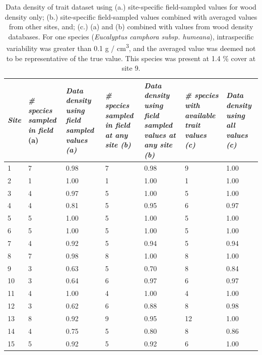 \begin{landscape}
\begin{table}[ht]
\tiny
\centering
\caption[Summary of PCA across all hydrological metrics.]{\small{Data density of trait dataset using (a.) site-specific field-sampled values for wood density only; (b.) site-specific field-sampled values combined with averaged values from other sites, and; (c.) (a) and (b) combined with values from wood density databases. For one species (\textit{Eucalyptus camphora subsp. humeana}), intraspecific variability was greater than 0.1 g / cm\textsuperscript{3}, and the averaged value was deemed not to be representative of the true value. This species was present at 1.4 \% cover at site 9.}}
\label{tab:Ch2sup_T4}
{\tabulinesep=1.2mm
\begin{tabu}to 
\hline
\textit{Site} & \textit{\# species sampled in field} (a) & \textit{Data density using field sampled values (a)} & \textit{\# species sampled in field at any site (b)} & \textit{Data density using field sampled values at any site (b)} & \textit{\# species with available trait values (c)} & \textit{Data density using all values (c)} \\  & 7 & 0.98 & 7 & 0.98 & 9 & 1.00 \\
2 & 1 & 1.00 & 1 & 1.00 & 1 & 1.00 \\
3 & 4 & 0.97 & 5 & 1.00 & 5 & 1.00 \\
4 & 4 & 0.81 & 5 & 0.95 & 6 & 0.97 \\
5 & 5 & 1.00 & 5 & 1.00 & 5 & 1.00 \\
6 & 5 & 1.00 & 5 & 1.00 & 5 & 1.00 \\
7 & 4 & 0.92 & 5 & 0.94 & 5 & 0.94 \\
8 & 7 & 0.98 & 8 & 1.00 & 8 & 1.00 \\
9 & 3 & 0.63 & 5 & 0.70 & 8 & 0.84 \\
10 & 3 & 0.64 & 6 & 0.97 & 6 & 0.97 \\
11 & 4 & 1.00 & 4 & 1.00 & 4 & 1.00 \\
12 & 3 & 0.62 & 6 & 0.88 & 8 & 0.98 \\
13 & 8 & 0.92 & 9 & 0.95 & 12 & 1.00 \\
14 & 4 & 0.75 & 5 & 0.80 & 8 & 0.86 \\
15 & 5 & 0.92 & 5 & 0.92 & 6 & 1.00 \\
\hline
\end{tabu}}
\end{table}
\end{landscape}
\clearpage

